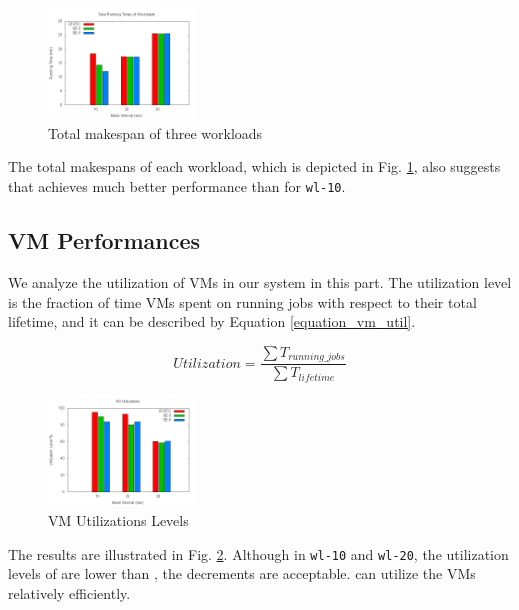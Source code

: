 \begin{figure}[!t]
\centering
\includegraphics[width=0.35\textwidth]{pictures/workload-runtime.png}
\caption{Total makespan of three workloads}
\label{figure_workloadmakespan}
\end{figure}

The total makespans of each workload, which is depicted in Fig.
\ref{figure_workloadmakespan}, also suggests that \SE{}
achieves much better performance than \STATIC{} for \texttt{wl-10}.


\subsection{VM Performances}
We analyze the utilization of VMs in our system in this part. The
utilization level is the fraction of time VMs spent on running jobs
with respect to their total lifetime, and it can be described by
Equation \ref{equation_vm_util}.

\begin{equation}
\label{equation_vm_util}
Utilization = \frac{\sum{T_{running\_jobs}}}{\sum{T_{lifetime}}}
\end{equation}

\begin{figure}[!t]
\centering
\includegraphics[width=0.35\textwidth]{pictures/vm-util.png}
\caption{VM Utilizations Levels}
\label{figure_vm_util}
\end{figure}

The results are illustrated in Fig. \ref{figure_vm_util}. Although in
\texttt{wl-10} and \texttt{wl-20}, the utilization levels of \SE{} are
lower than \STATIC{}, the decrements are acceptable. \SE{} can utilize
the VMs relatively efficiently.

